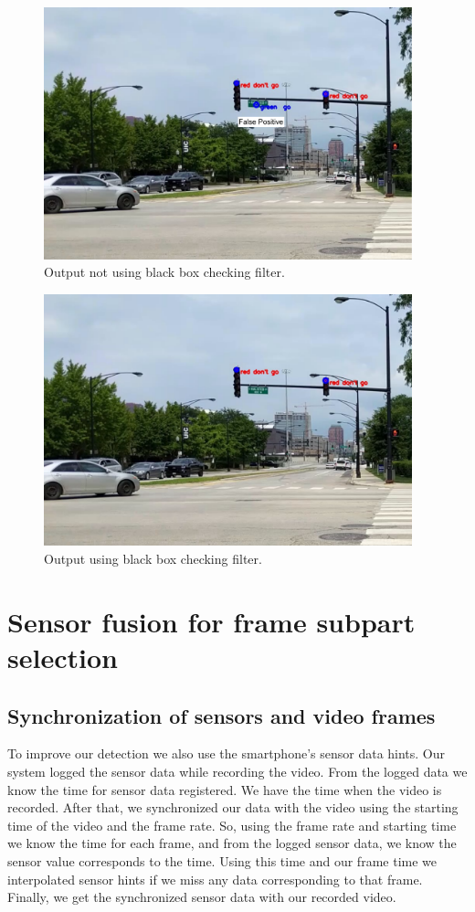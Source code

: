 \begin{figure}[!ht]
\centering
\includegraphics[width=4.2in]{images/norec_filter.pdf}
\caption{Output not using black box checking filter.}
\label{f:norec_filter}
\end{figure}



\begin{figure}[ht!]
\centering
\includegraphics[width=4.2in]{images/rec_filter.pdf}
\caption{Output using black box checking filter.}
\label{f:rec_filter}
\end{figure}




\section{Sensor fusion for frame subpart selection}

\subsection{Synchronization of sensors and video frames}
To improve our detection we also use the smartphone's sensor data hints.
Our system logged the sensor data while recording the video.
From the logged data we know the time for sensor data registered.
We have the time when the video is recorded.
After that, we synchronized our data with the video using the starting time of the video and the frame rate.
So, using the frame rate and starting time we know the time for each frame, and from the logged sensor data, we know the sensor value corresponds to the time.
Using this time and our frame time we interpolated sensor hints if we miss any data corresponding to that frame.
Finally, we get the synchronized sensor data with our recorded video.

